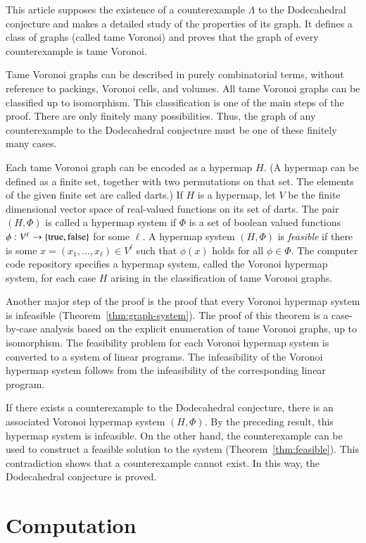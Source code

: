 \documentclass{article} %
\begin{document}
This article supposes the existence of a counterexample $\Lambda$ to
the Dodecahedral conjecture and makes a detailed study of the
properties of its graph. It defines a class of graphs (called tame
Voronoi) and proves that the graph of every counterexample is tame
Voronoi.

Tame Voronoi graphs can be described in purely combinatorial terms,
without reference to packings, Voronoi cells, and volumes. All tame
Voronoi graphs can be classified up to isomorphism. This
classification is one of the main steps of the proof. There are only
finitely many possibilities. Thus, the graph of any counterexample to
the Dodecahedral conjecture must be one of these finitely many cases.

Each tame Voronoi graph can be encoded as a hypermap $H$. (A hypermap
can be defined as a finite set, together with two permutations on that
set. The elements of the given finite set are called darts.) If $H$ is
a hypermap, let $V$ be the finite dimensional vector space of
real-valued functions on its set of darts. The pair $(H,\Phi)$ is
called a hypermap system if $\Phi$ is a set of boolean valued
functions $\phi:V^\ell \to \{{\operatorname{true}},{\operatorname{false}}\}$ for some $\ell$.
A hypermap system $(H,\Phi)$ is {\it feasible} if there is some
$x=(x_1,\ldots,x_\ell)\in V^\ell$ such that $\phi(x)$ holds for all
$\phi\in\Phi$. The computer code repository specifies 
a hypermap system, called
the Voronoi hypermap system, for each case $H$ arising in the
classification of tame Voronoi graphs.

Another major step of the proof is the proof that every Voronoi
hypermap system is infeasible (Theorem~\ref{thm:graph-system}). The
proof of this theorem is a case-by-case analysis based on the explicit
enumeration of tame Voronoi graphs, up to isomorphism. The feasibility
problem for each Voronoi hypermap system is converted to a system of
linear programs. The infeasibility of the Voronoi hypermap system
follows from the infeasibility of the corresponding linear program.

If there exists a counterexample to the Dodecahedral conjecture, there
is an associated Voronoi hypermap system $(H,\Phi)$. By the preceding
result, this hypermap system is infeasible. On the other hand, the
counterexample can be used to construct a feasible solution to the
system (Theorem~\ref{thm:feasible}). This contradiction shows that a
counterexample cannot exist. In this way, the Dodecahedral conjecture
is proved.

\section{Computation}
\end{document}
